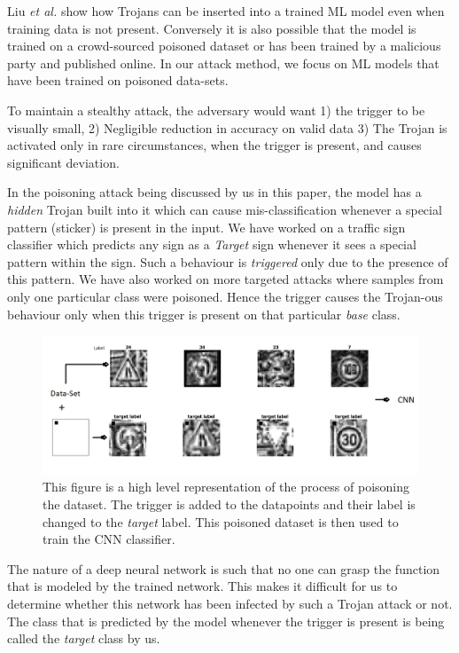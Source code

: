 \documentclass{article}
\newcommand{\etal}[0]{\emph{et al.}}
\begin{document}
Liu \etal \cite{liu2017trojaning} show how Trojans can be inserted into a trained ML model even when training data is not present. Conversely it is also possible that the model is trained on a crowd-sourced poisoned dataset or has been trained by a malicious party and published online. In our attack method, we focus on ML models that have been trained on poisoned data-sets.

To maintain a stealthy attack, the adversary would want 1) the trigger to be visually small, 2) Negligible reduction in accuracy on valid data 3) The Trojan is activated only in rare circumstances, when the trigger is present, and causes significant deviation.

In the poisoning attack being discussed by us in this paper, the model has a \emph{hidden} Trojan built into it which can cause mis-classification whenever a special pattern (sticker) is present in the input. We have worked on a traffic sign classifier which predicts any sign as a \emph{Target} sign whenever it sees a special pattern within the sign. Such a behaviour is \emph{triggered} only due to the presence of this pattern. We have also worked on more targeted attacks where samples from only one particular class were poisoned. Hence the trigger causes the Trojan-ous behaviour only when this trigger is present on that particular \emph{base} class. 
\begin{figure}
    \centering
    \includegraphics[width=\textwidth]{1.png}
    \caption{This figure is a high level representation of the process of poisoning the dataset. The trigger is added to the datapoints and their label is changed to the \emph{target} label. This poisoned dataset is then used to train the CNN classifier.}
    \label{fig:1}
\end{figure}
The nature of a deep neural network is such that no one can grasp the function that is modeled by the trained network. This makes it difficult for us to determine whether this network has been infected by such a Trojan attack or not. The class that is predicted by the model whenever the trigger is present is being called the \emph{target} class by us.
\end{document}
